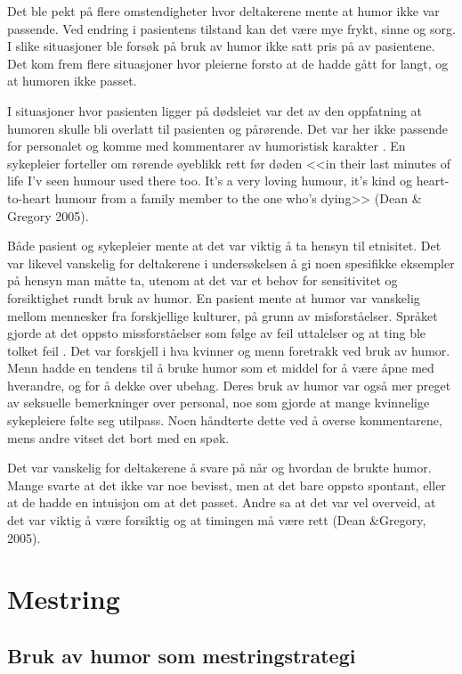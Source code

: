 Det ble pekt på flere omstendigheter hvor deltakerene mente at humor ikke var
passende. Ved endring i pasientens tilstand kan det være mye frykt, sinne og
sorg. I slike situasjoner ble forsøk på bruk av humor ikke satt pris på av
pasientene. Det kom frem flere situasjoner hvor pleierne forsto at de hadde
gått for langt, og at humoren ikke passet.

I situasjoner hvor pasienten ligger på dødsleiet var det av den oppfatning at
humoren skulle bli overlatt til pasienten og pårørende. Det var her ikke
passende for personalet og komme med kommentarer av humoristisk karakter .  En
sykepleier forteller om rørende øyeblikk rett før døden <<in their last minutes
of life I’v seen humour used there too. It’s a very loving humour, it’s kind og
heart-to-heart humour from a family member to the one who’s dying>> (Dean \&{}
Gregory 2005).

Både pasient og sykepleier mente at det var viktig å ta hensyn til etnisitet.
Det var likevel vanskelig for deltakerene i undersøkelsen  å gi noen spesifikke
eksempler på hensyn man måtte ta, utenom at det var et behov for sensitivitet
og forsiktighet rundt bruk av humor. En pasient mente at humor var vanskelig
mellom mennesker fra forskjellige kulturer, på grunn av misforståelser. Språket
gjorde at det oppsto missforståelser som følge av feil uttalelser og at ting
ble tolket feil .  Det var forskjell i hva kvinner og menn foretrakk ved bruk
av humor. Menn hadde en tendens til å bruke humor som et middel for å være åpne
med hverandre, og for å dekke over ubehag. Deres bruk av humor var også mer
preget av seksuelle bemerkninger over personal, noe som gjorde at mange
kvinnelige sykepleiere følte seg utilpass. Noen håndterte dette ved å overse
kommentarene, mens andre vitset det bort med en spøk. 

Det var vanskelig for deltakerene å svare på når og hvordan de brukte humor.
Mange svarte at det ikke var noe bevisst, men at det bare oppsto spontant,
eller at de hadde en intuisjon om at det passet. Andre sa at det var vel
overveid, at det var viktig å være forsiktig og at timingen må være rett (Dean
\&{}Gregory, 2005).

\section{Mestring}

\subsection{Bruk av humor som mestringstrategi}

